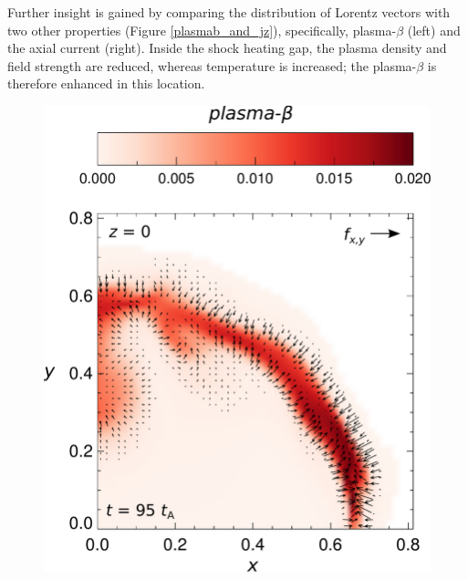\documentclass{./packages/rs/rsproca}
\begin{document}
Further insight is gained by comparing the distribution of Lorentz vectors with two other properties (Figure \ref{plasmab_and_jz}), specifically, plasma-$\beta$ (left) and the axial current (right). Inside the shock heating gap, the plasma density and field strength are reduced, whereas temperature is increased; the plasma-$\beta$ is therefore enhanced in this location.
\begin{figure}[h!]
  \center  
  \includegraphics[scale=0.35]{./inkscape/256x256x512/plasmab_sca_rf_vec}

\end{figure}
\end{document}

